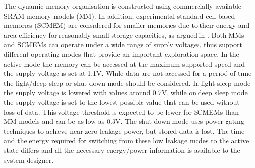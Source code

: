 The dynamic memory organisation is constructed using commercially available SRAM memory models (MM). In addition, experimental standard cell-based memories (SCMEM) \cite{Mei11}  are  considered for smaller memories due to their energy and area efficiency for reasonably small storage capacities, as argued in \cite{Mei10}. Both MMs and SCMEMs can operate under a wide range of supply voltages, thus support different operating modes that provide an important exploration space. In the active mode the memory can be accessed at the maximum supported speed and the supply voltage is set at 1.1V. While data are not accessed for a period of time the light/deep sleep or shut down mode should be considered. In light sleep mode the supply voltage is lowered with values around 0.7V, while on deep sleep mode the supply voltage is set to the lowest possible value that can be used without loss of data. This voltage threshold is expected to be lower for SCMEMs than MM models and can be as low as 0.3V. The shut down mode uses power-gating techniques to achieve near zero leakage power, but stored data is lost. The time and the energy required for switching from these low leakage modes to the active state differs and all the necessary energy/power information is available to the system designer.


